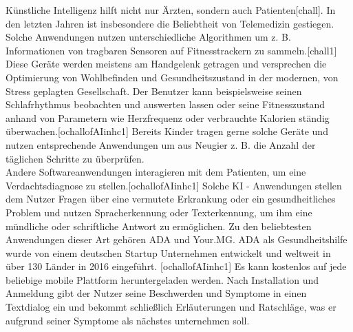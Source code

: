 Künstliche Intelligenz hilft nicht nur Ärzten, sondern auch Patienten[chall]. In den letzten Jahren ist insbesondere die Beliebtheit von Telemedizin gestiegen. Solche Anwendungen nutzen unterschiedliche Algorithmen um z. B. Informationen von tragbaren Sensoren auf Fitnesstrackern zu sammeln.[chall1] Diese Geräte werden meistens am Handgelenk getragen und versprechen die Optimierung von Wohlbefinden und Gesundheitszustand in der modernen, von Stress geplagten Gesellschaft. Der Benutzer kann beispielsweise seinen Schlafrhythmus beobachten und auswerten lassen oder seine Fitnesszustand anhand von Parametern wie Herzfrequenz oder verbrauchte Kalorien ständig überwachen.[ochallofAIinhc1] Bereits Kinder tragen gerne solche Geräte und nutzen entsprechende Anwendungen um aus Neugier z. B. die Anzahl der täglichen Schritte zu überprüfen. \\

Andere Softwareanwendungen interagieren mit dem Patienten, um eine Verdachtsdiagnose zu stellen.[ochallofAIinhc1] Solche KI - Anwendungen stellen dem Nutzer Fragen über eine vermutete Erkrankung oder ein gesundheitliches Problem und nutzen Spracherkennung oder Texterkennung, um ihm eine mündliche oder schriftliche Antwort zu ermöglichen.
Zu den beliebtesten Anwendungen dieser Art gehören ADA und Your.MG. ADA als Gesundheitshilfe wurde von einem deutschen Startup Unternehmen entwickelt und weltweit in über 130 Länder in 2016 eingeführt. [ochallofAIinhc1] Es kann kostenlos auf jede beliebige mobile Plattform heruntergeladen werden. Nach Installation und Anmeldung gibt der Nutzer seine Beschwerden und Symptome in einen Textdialog ein und bekommt schließlich Erläuterungen und Ratschläge, was er aufgrund seiner Symptome als nächstes unternehmen soll.\\
 
